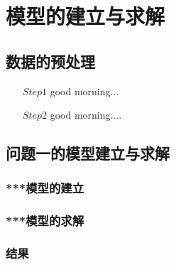 \newpage	
\section{模型的建立与求解}
\subsection{数据的预处理}


\begin{enumerate}[
	label = (\arabic*),
	itemindent = 0pt,
	labelindent = \parindent,
	labelwidth = 2em,
	labelsep = 5pt,
	leftmargin = *]
	\item[$      Step 1$] \quad good morning...
	\item[$      Step 2$] \quad good morning....
\end{enumerate}


\subsection{问题一的模型建立与求解}
\subsubsection{***模型的建立}


\subsubsection{***模型的求解}


\subsubsection{结果}


